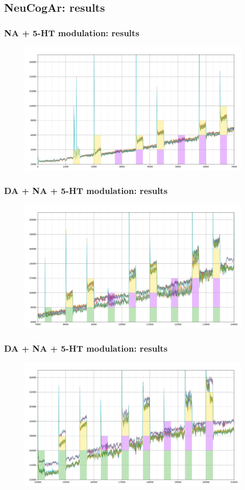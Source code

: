 \documentclass[12pt, aspectratio=169]{beamer}
\begin{document}
\subsection{NeuCogAr: results}
\begin{frame}
\frametitle{NA + 5-HT modulation: results}
\begin{figure}
\includegraphics[width=0.9\linewidth]{1.png}
\end{figure}
\end{frame}
\begin{frame}
\frametitle{DA + NA + 5-HT modulation: results}
\begin{figure}
\includegraphics[width=0.9\linewidth]{2}
\end{figure}
\end{frame}
\begin{frame}
\frametitle{DA + NA + 5-HT modulation: results}
\begin{figure}
\includegraphics[width=0.9\linewidth]{3}
\end{figure}
\end{frame}
\end{document}
